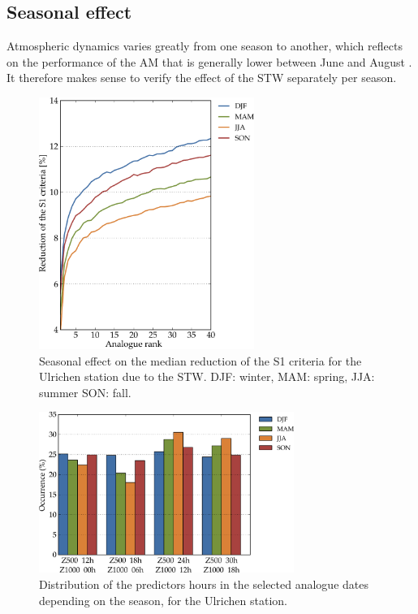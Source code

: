 \documentclass[hess]{copernicus}
\begin{document}
\subsection{Seasonal effect}
\label{sec:seasonal_effect}

Atmospheric dynamics varies greatly from one season to another, which reflects on the performance of the AM that is generally lower between June and August \citep{Bliefernicht2010}. It therefore makes sense to verify the effect of the STW separately per season.

\begin{figure}[htb]
	\begin{center}
		\includegraphics[width=7cm]{figures/changes_S1_seasons.pdf}
	\end{center}
	\caption{Seasonal effect on the median reduction of the S1 criteria for the Ulrichen station due to the STW. DJF: winter, MAM: spring, JJA: summer SON: fall.}
	\label{fig:changes_S1_seasons}
\end{figure}

\begin{figure}[htb]
	\includegraphics[width=8.3cm]{figures/hours_selection_per_season.pdf}
	\caption{Distribution of the predictors hours in the selected analogue dates depending on the season, for the Ulrichen station.}
	\label{fig:hours_selection_per_season}
\end{figure}
\end{document}
